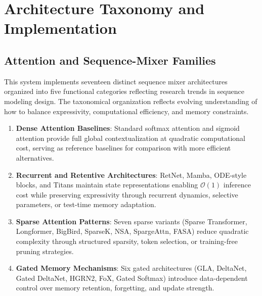 \documentclass[11pt,a4paper]{article}
\begin{document}
\section{Architecture Taxonomy and Implementation}
\label{sec:architecture-taxonomy}

\subsection{Attention and Sequence-Mixer Families}
\label{sec:attention-families}

This system implements seventeen distinct sequence mixer architectures organized into five functional categories reflecting research trends in sequence modeling design. The taxonomical organization reflects evolving understanding of how to balance expressivity, computational efficiency, and memory constraints.

\begin{enumerate}[leftmargin=*]
    \item \textbf{Dense Attention Baselines}: Standard softmax attention and sigmoid attention provide full global contextualization at quadratic computational cost, serving as reference baselines for comparison with more efficient alternatives.
    \item \textbf{Recurrent and Retentive Architectures}: RetNet, Mamba, ODE-style blocks, and Titans maintain state representations enabling $\mathcal{O}(1)$ inference cost while preserving expressivity through recurrent dynamics, selective parameters, or test-time memory adaptation.
    \item \textbf{Sparse Attention Patterns}: Seven sparse variants (Sparse Transformer, Longformer, BigBird, SparseK, NSA, SpargeAttn, FASA) reduce quadratic complexity through structured sparsity, token selection, or training-free pruning strategies.
    \item \textbf{Gated Memory Mechanisms}: Six gated architectures (GLA, DeltaNet, Gated DeltaNet, HGRN2, FoX, Gated Softmax) introduce data-dependent control over memory retention, forgetting, and update strength.
\end{enumerate}
\end{document}
